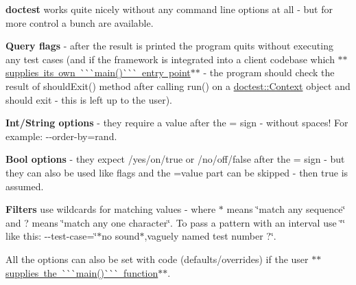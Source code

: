 {\bfseries{doctest}} works quite nicely without any command line options at all -\/ but for more control a bunch are available.

{\bfseries{Query flags}} -\/ after the result is printed the program quits without executing any test cases (and if the framework is integrated into a client codebase which \mbox{\hyperlink{md__c___users__u_s_e_r_source_repos_bzareva_star_wars_universe_0_1_doctest_doc_markdown_main}{$\ast$$\ast$supplies it\textquotesingle{}s own \`{}\`{}\`{}main()\`{}\`{}\`{} entry point$\ast$$\ast$}} -\/ the program should check the result of {\ttfamily should\+Exit()} method after calling {\ttfamily run()} on a {\ttfamily \mbox{\hyperlink{classdoctest_1_1_context}{doctest\+::\+Context}}} object and should exit -\/ this is left up to the user).

{\bfseries{Int/\+String options}} -\/ they require a value after the {\ttfamily =} sign -\/ without spaces! For example\+: {\ttfamily -\/-\/order-\/by=rand}.

{\bfseries{Bool options}} -\/ they expect {}/{\ttfamily yes}/{\ttfamily on}/{\ttfamily true} or {}/{\ttfamily no}/{\ttfamily off}/{\ttfamily false} after the {\ttfamily =} sign -\/ but they can also be used like flags and the {\ttfamily =value} part can be skipped -\/ then {\ttfamily true} is assumed. ~\newline


{\bfseries{Filters}} use wildcards for matching values -\/ where {\ttfamily $\ast$} means \char`\"{}match any sequence\char`\"{} and {\ttfamily ?} means \char`\"{}match any one character\char`\"{}. To pass a pattern with an interval use {\ttfamily \char`\"{}\char`\"{}} like this\+: {\ttfamily -\/-\/test-\/case=\char`\"{}$\ast$no sound$\ast$,vaguely named test number ?\char`\"{}}.

All the options can also be set with code (defaults/overrides) if the user \mbox{\hyperlink{md__c___users__u_s_e_r_source_repos_bzareva_star_wars_universe_0_1_doctest_doc_markdown_main}{$\ast$$\ast$supplies the \`{}\`{}\`{}main()\`{}\`{}\`{} function$\ast$$\ast$}}.

